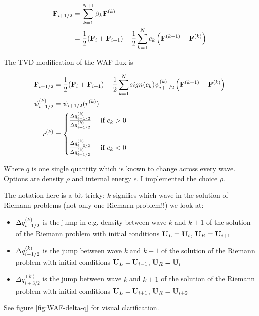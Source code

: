 \begin{align}
	\F_{i + \half} 
		&= \sum\limits_{k = 1}^{N+1} \beta_k \F^{(k)} \\
		&= \frac{1}{2} (\F_i + \F_{i+1}) - \frac{1}{2} \sum\limits_{k = 1}^{N} c_k \left (\F^{(k+1)} - \F^{(k)} \right) 
\end{align}




The TVD modification of the WAF flux is


\begin{align}
	\F_{i + \half} 
		&= \frac{1}{2} (\F_i + \F_{i+1}) - \frac{1}{2} \sum\limits_{k = 1}^{N} sign(c_k) \psi_{i+\half}^{(k)} \left (\F^{(k+1)} - \F^{(k)} \right) \\
	\psi_{i+\half}^{(k)}
		&= \psi_{i+\half}(r^{(k)}) \\
	r^{(k)} &=
		\begin{cases}
			\frac{\Delta q_{i-\half}^{(k)}}{\Delta q_{i+\half}^{(k)}}	& \text{ if } c_k > 0 \\[2em]
			\frac{\Delta q_{i+3/2}^{(k)}}{\Delta q_{i+\half}^{(k)}}	& \text{ if } c_k < 0 \\		
		\end{cases}
\end{align}

Where $q$ is one single quantity which is known to change across every wave.
Options are density $\rho$ and internal energy $\epsilon$.
I implemented the choice $\rho$.

The notation here is a bit tricky: $k$ signifies which wave in the solution of Riemann problems (not only one Riemann problem!!) we look at:

\begin{itemize}
	\item $\Delta q_{i+1/2}^{(k)}$ is the jump in e.g. density between wave $k$ and $k + 1$ of the solution of the Riemann problem with initial conditions $\mathbf{U}_L = \mathbf{U}_i$, $\mathbf{U}_R = \mathbf{U}_{i+1}$
	\item $\Delta q_{i-1/2}^{(k)}$ is the jump between wave $k$ and $k+1$ of the solution of the Riemann problem with initial conditions $\mathbf{U}_L = \mathbf{U}_{i-1}$, $\mathbf{U}_R = \mathbf{U}_{i}$
	\item $\Delta q_{i+3/2}^{(k)}$ is the jump between wave $k$ and $k+1$ of the solution of the Riemann problem with initial conditions $\mathbf{U}_L = \mathbf{U}_{i+1}$, $\mathbf{U}_R = \mathbf{U}_{i+2}$
\end{itemize}

See figure \ref{fig:WAF-delta-q} for visual clarification.



